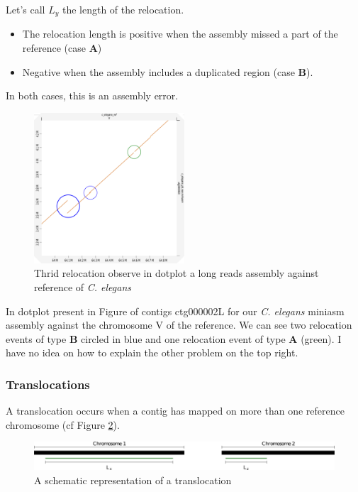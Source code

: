 \documentclass[./main.tex]{subfiles}
\begin{document}
Let's call $L_y$ the length of the relocation.

\begin{itemize}
\item The relocation length is positive when the assembly missed a part of the reference (case \textbf{A})
\item Negative when the assembly includes a duplicated region (case \textbf{B}).
\end{itemize}

In both cases, this is an assembly error.

\begin{figure}[ht]
    \centering
    \includegraphics[width=0.5\textwidth]{paper/misassemblies-in-noisy-assemblies/relocation_dotplot_exemple.pdf}
    \caption{Thrid relocation observe in dotplot a long reads assembly against reference of \textit{C. elegans}}
    \label{relocation_exp}
\end{figure}

In dotplot present in Figure \label{relocation_exp} of contigs ctg000002L for our \emph{C. elegans}
miniasm assembly against the chromosome V of the reference. We can see
two relocation events of type \textbf{B} circled in blue and one
relocation event of type \textbf{A} (green). I have no idea on how to
explain the other problem on the top right.

\subsubsection{Translocations}

A translocation occurs when a contig has mapped on more than one reference chromosome (cf Figure \ref{translocation_def}).
\begin{figure}[ht]
    \centering
    \includegraphics[width=\textwidth]{paper/misassemblies-in-noisy-assemblies/translocation_def.pdf}
    \caption{A schematic representation of a translocation}
    \label{translocation_def}
\end{figure}
\end{document}

